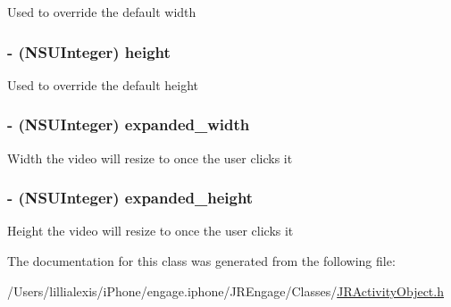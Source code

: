 \label{interface_j_r_flash_media_object_aaeb77e697438b7aa6e44f52bea0ed9c2}
Used to override the default width \hypertarget{interface_j_r_flash_media_object_a0689e19fdf6cb9d3911878a95d6ebcc9}{
\subsubsection[{height}]{\setlength{\rightskip}{0pt plus 5cm}-\/ (NSUInteger) height}}
\label{interface_j_r_flash_media_object_a0689e19fdf6cb9d3911878a95d6ebcc9}
Used to override the default height \hypertarget{interface_j_r_flash_media_object_a9c380d0410afa60d99442f4ab84b517c}{
\subsubsection[{expanded\_\-width}]{\setlength{\rightskip}{0pt plus 5cm}-\/ (NSUInteger) expanded\_\-width}}
\label{interface_j_r_flash_media_object_a9c380d0410afa60d99442f4ab84b517c}
Width the video will resize to once the user clicks it \hypertarget{interface_j_r_flash_media_object_ae390a89405d768f2fcc63c24a8271503}{
\subsubsection[{expanded\_\-height}]{\setlength{\rightskip}{0pt plus 5cm}-\/ (NSUInteger) expanded\_\-height}}
\label{interface_j_r_flash_media_object_ae390a89405d768f2fcc63c24a8271503}
Height the video will resize to once the user clicks it 

The documentation for this class was generated from the following file:\begin{DoxyCompactItemize}
\item 
/Users/lillialexis/iPhone/engage.iphone/JREngage/Classes/\hyperlink{_j_r_activity_object_8h}{JRActivityObject.h}\end{DoxyCompactItemize}
